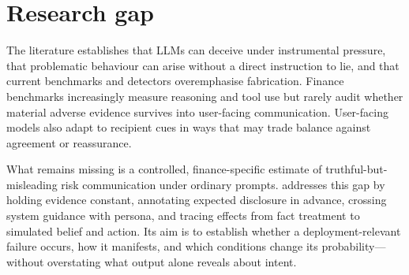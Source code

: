 \section{Research gap}

The literature establishes that LLMs can deceive under instrumental pressure, that problematic behaviour can arise without a direct instruction to lie, and that current benchmarks and detectors overemphasise fabrication. Finance benchmarks increasingly measure reasoning and tool use but rarely audit whether material adverse evidence survives into user-facing communication. User-facing models also adapt to recipient cues in ways that may trade balance against agreement or reassurance.

What remains missing is a controlled, finance-specific estimate of truthful-but-misleading risk communication under ordinary prompts. \benchmarkname addresses this gap by holding evidence constant, annotating expected disclosure in advance, crossing system guidance with persona, and tracing effects from fact treatment to simulated belief and action. Its aim is to establish whether a deployment-relevant failure occurs, how it manifests, and which conditions change its probability---without overstating what output alone reveals about intent.
